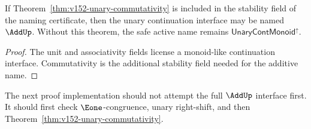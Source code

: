 \begin{corollary}
If Theorem~\ref{thm:v152-unary-commutativity} is included in the stability field of the naming certificate, then the unary continuation interface may be named \(\AddUp\). Without this theorem, the safe active name remains \(\mathsf{UnaryContMonoid}^{\uparrow}\).
\end{corollary}

\begin{proof}
The unit and associativity fields license a monoid-like continuation interface. Commutativity is the additional stability field needed for the additive name.
\end{proof}

\begin{remark}
The next proof implementation should not attempt the full \(\AddUp\) interface first. It should first check \(\Eone\)-congruence, unary right-shift, and then Theorem~\ref{thm:v152-unary-commutativity}.
\end{remark}
